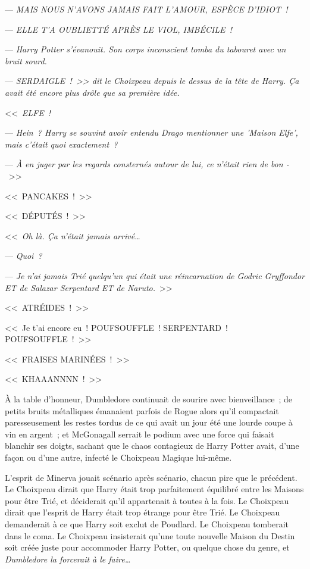 {--- \emph{MAIS NOUS N'AVONS JAMAIS FAIT L'AMOUR, ESPÈCE D'IDIOT~!}

--- \emph{ELLE T'A OUBLIETTÉ APRÈS LE VIOL, IMBÉCILE~!}

--- \emph{Harry Potter s'évanouit. Son corps inconscient tomba du tabouret avec un bruit sourd.}

--- \emph{SERDAIGLE~!~>> dit le Choixpeau depuis le dessus de la tête de Harry. Ça avait été encore plus drôle que sa première idée.}

\later

<<~\emph{ELFE~!}

--- \emph{Hein~? Harry se souvint avoir entendu Drago mentionner une 'Maison Elfe', mais c'était quoi exactement~?}

--- \emph{À en juger par les regards consternés autour de lui, ce n'était rien de bon -}~>>

\later

<<~PANCAKES~!~>>

\later

<<~DÉPUTÉS~!~>>

\later

<<~\emph{Oh là. Ça n'était jamais arrivé…}

--- \emph{Quoi~?}

--- \emph{Je n'ai jamais Trié quelqu'un qui était une réincarnation de Godric Gryffondor ET de Salazar Serpentard ET de Naruto.}~>>

\later

<<~ATRÉIDES~!~>>

\later

<<~Je t'ai encore eu~! POUFSOUFFLE~! SERPENTARD~! POUFSOUFFLE~!~>>

\later

<<~FRAISES MARINÉES~!~>>

\later

<<~KHAAANNNN~!~>>

\later

À la table d'honneur, Dumbledore continuait de sourire avec bienveillance~; de petits bruits métalliques émanaient parfois de Rogue alors qu'il compactait paresseusement les restes tordus de ce qui avait un jour été une lourde coupe à vin en argent~; et McGonagall serrait le podium avec une force qui faisait blanchir ses doigts, sachant que le chaos contagieux de Harry Potter avait, d'une façon ou d'une autre, infecté le Choixpeau Magique lui-même.

L'esprit de Minerva jouait scénario après scénario, chacun pire que le précédent. Le Choixpeau dirait que Harry était trop parfaitement équilibré entre les Maisons pour être Trié, et déciderait qu'il appartenait à toutes à la fois. Le Choixpeau dirait que l'esprit de Harry était trop étrange pour être Trié. Le Choixpeau demanderait à ce que Harry soit exclut de Poudlard. Le Choixpeau tomberait dans le coma. Le Choixpeau insisterait qu'une toute nouvelle Maison du Destin soit créée juste pour accommoder Harry Potter, ou quelque chose du genre, et \emph{Dumbledore la forcerait à le faire…}

}
